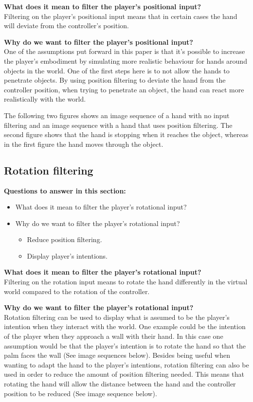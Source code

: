 \textbf{What does it mean to filter the player's positional input?}\\
Filtering on the player's positional input means that in certain cases the hand will deviate from the controller's position.

\textbf{Why do we want to filter the player's positional input?}\\
One of the assumptions put forward in this paper is that it's possible to increase the player's embodiment by simulating more realistic behaviour for hands around objects in the world. One of the first steps here is to not allow the hands to penetrate objects. By using position filtering to deviate the hand from the controller position, when trying to penetrate an object, the hand can react more realistically with the world.

The following two figures shows an image sequence of a hand with no input filtering and an image sequence with a hand that uses position filtering. The second figure shows that the hand is stopping when it reaches the object, whereas in the first figure the hand moves through the object.


\subsection{Rotation filtering}
\label{subsec:categoryRotationFiltering}
\textbf{Questions to answer in this section:}
\begin{itemize}
\item What does it mean to filter the player's rotational input?
\item Why do we want to filter the player's rotational input?
\begin{itemize}
\item Reduce position filtering.
\item Display player's intentions.
\end{itemize}
\end{itemize}

\textbf{What does it mean to filter the player's rotational input?}\\
Filtering on the rotation input means to rotate the hand differently in the virtual world compared to the rotation of the controller.

\textbf{Why do we want to filter the player's rotational input?}\\
Rotation filtering can be used to display what is assumed to be the player's intention when they interact with the world. One example could be the intention of the player when they approach a wall with their hand. In this case one assumption would be that the player's intention is to rotate the hand so that the palm faces the wall (See image sequences below). Besides being useful when wanting to adapt the hand to the player's intentions, rotation filtering can also be used in order to reduce the amount of position filtering needed. This means that rotating the hand will allow the distance between the hand and the controller position to be reduced (See image sequence below).


